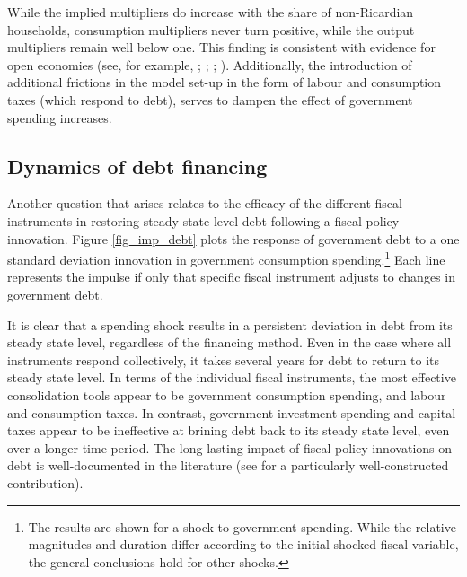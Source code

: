 \documentclass[a4paper,11pt]{article}
\numberwithin{equation}{section}
\begin{document}
	While the implied multipliers do increase with the share of non-Ricardian households, consumption multipliers never turn positive, while the output multipliers remain well below one. This finding is consistent with evidence for open economies (see, for example, \citealp{ratto2006}; \citealp{forni2009}; \citealp{naitram}; \citealp{sin2016}). Additionally, the introduction of additional frictions in the model set-up in the form of labour and consumption taxes (which respond to debt), serves to dampen the effect of government spending increases.

 
	
	\subsection{Dynamics of debt financing}
	
	Another question that arises relates to the efficacy of the different fiscal instruments in restoring steady-state level debt following a fiscal policy innovation. Figure \ref{fig_imp_debt} plots the response of government debt to a one standard deviation innovation in government consumption spending.\footnote{The results are shown for a shock to government spending. While the relative magnitudes and duration differ according to the initial shocked fiscal variable, the general conclusions hold for other shocks.} Each line represents the impulse if only that specific fiscal instrument adjusts to changes in government debt.
	
	It is clear that a spending shock results in a persistent deviation in debt from its steady state level, regardless of the financing method. Even in the case where all instruments respond collectively, it takes several years for debt to return to its steady state level. In terms of the individual fiscal instruments, the most effective consolidation tools appear to be government consumption spending, and labour and consumption taxes. In contrast, government investment spending and capital taxes appear to be ineffective at brining debt back to its steady state level, even over a longer time period. The long-lasting impact of fiscal policy innovations on debt is well-documented in the literature (see \citealp{leeper2010} for a particularly well-constructed contribution). 
	
\end{document}
